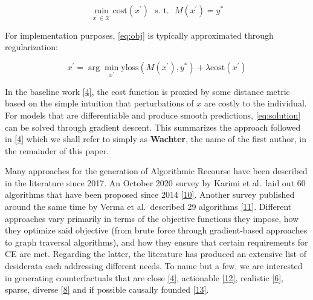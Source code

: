 \documentclass[conference,final,]{IEEEtran}
\theoremstyle{definition}
\theoremstyle{definition}
\theoremstyle{definition}
\theoremstyle{definition}
\theoremstyle{remark}
\begin{document}
\begin{equation}
\min_{x^\prime \in \mathcal{X}} \text{cost}(x^\prime) \ \ \ \mbox{s. t.} \ \ \ M(x^\prime) = y^* \label{eq:obj}
\end{equation}

For implementation purposes, \eqref{eq:obj} is typically approximated through regularization:

\begin{equation}
x^\prime = \arg \min_{x^\prime}  \text{yloss}(M(x^\prime),y^*) + \lambda \text{cost}(x^\prime) \label{eq:solution}
\end{equation}

In the baseline work \protect\hyperlink{ref-wachter2017counterfactual}{{[}4{]}}, the cost function is proxied by some distance metric based on the simple intuition that perturbations of \(x\) are costly to the individual. For models that are differentiable and produce smooth predictions, \eqref{eq:solution} can be solved through gradient descent. This summarizes the approach followed in \protect\hyperlink{ref-wachter2017counterfactual}{{[}4{]}} which we shall refer to simply as \textbf{Wachter}, the name of the first author, in the remainder of this paper.

Many approaches for the generation of Algorithmic Recourse have been described in the literature since 2017. An October 2020 survey by Karimi et al.~laid out 60 algorithms that have been proposed since 2014 \protect\hyperlink{ref-karimi2020survey}{{[}10{]}}. Another survey published around the same time by Verma et al.~described 29 algorithms \protect\hyperlink{ref-verma2020counterfactual}{{[}11{]}}. Different approaches vary primarily in terms of the objective functions they impose, how they optimize said objective (from brute force through gradient-based approaches to graph traversal algorithms), and how they ensure that certain requirements for CE are met. Regarding the latter, the literature has produced an extensive list of desiderata each addressing different needs. To name but a few, we are interested in generating counterfactuals that are close \protect\hyperlink{ref-wachter2017counterfactual}{{[}4{]}}, actionable \protect\hyperlink{ref-ustun2019actionable}{{[}12{]}}, realistic \protect\hyperlink{ref-schut2021generating}{{[}6{]}}, sparse, diverse \protect\hyperlink{ref-mothilal2020explaining}{{[}8{]}} and if possible causally founded \protect\hyperlink{ref-karimi2021algorithmic}{{[}13{]}}.
\end{document}
